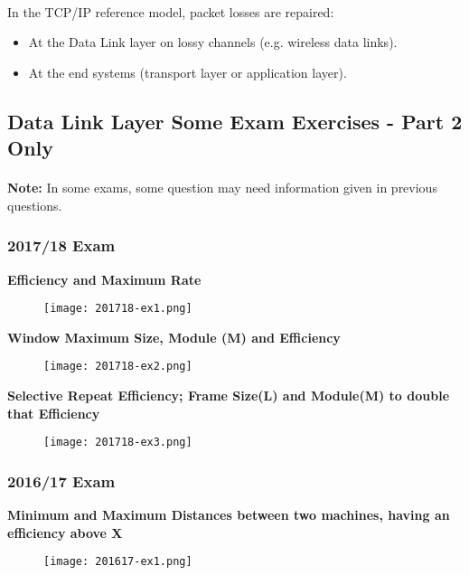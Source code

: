 \documentclass[../resumosRCOM.tex]{subfiles}
\begin{document}
\paragraph{}
In the TCP/IP reference model, packet losses are repaired:
\begin{itemize}
    \item At the Data Link layer on lossy channels (e.g. wireless data links).
    \item At the end systems (transport layer or application layer).
\end{itemize}


\subsection{Data Link Layer Some Exam Exercises - Part 2 Only}
\paragraph{}
\textbf{Note: } 
In some exams, some question may need information given in previous questions.

\subsubsection{2017/18 Exam}

\textbf{Efficiency and Maximum Rate}
\begin{figure}[H]
    \centering
    \texttt{[image: 201718-ex1.png]}
\end{figure}

\textbf{Window Maximum Size, Module (M) and Efficiency}
\begin{figure}[H]
    \centering
    \texttt{[image: 201718-ex2.png]}
\end{figure}

\textbf{Selective Repeat Efficiency; Frame Size(L) and Module(M) to double that 
Efficiency}
\begin{figure}[H]
    \centering
    \texttt{[image: 201718-ex3.png]}
\end{figure}



\subsubsection{2016/17 Exam}

\textbf{Minimum and Maximum Distances between two machines, having an 
efficiency above X}
\begin{figure}[H]
    \centering
    \texttt{[image: 201617-ex1.png]}
\end{figure}
\end{document}

